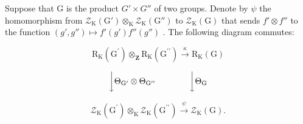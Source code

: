 Suppose that G is the product \(G' \times G''\) of two groups. Denote by \(\psi\) the homomorphism from \(\mathcal{Z}_{\mathrm{K}}(\mathrm{G}') \otimes_{\mathrm{K}} \mathcal{Z}_{\mathrm{K}}(\mathrm{G}'' )\) to \(\mathcal{Z}_{\mathrm{K}}(\mathrm{G})\) that sends \(f' \otimes f''\) to the function \((g', g'') \mapsto f'(g')f''(g'')\) . The following diagram commutes:

\[
\mathrm{R} _ {\mathrm{K}} (\mathrm{G} ^ {\prime}) \otimes_ {\mathbf {Z}} \mathrm{R} _ {\mathrm{K}} (\mathrm{G} ^ {\prime \prime}) \xrightarrow {\kappa} \mathrm{R} _ {\mathrm{K}} (\mathrm{G})
\]

\[
\bigg \downarrow \Theta_ {\mathrm{G} ^ {\prime}} \otimes \Theta_ {\mathrm{G} ^ {\prime \prime}} \qquad \qquad \bigg \downarrow \Theta_ {\mathrm{G}}
\]

\[
\mathcal {Z} _ {\mathrm{K}} (\mathrm{G} ^ {\prime}) \otimes_ {\mathrm{K}} \mathcal {Z} _ {\mathrm{K}} (\mathrm{G} ^ {\prime \prime}) \xrightarrow {\psi} \mathcal {Z} _ {\mathrm{K}} (\mathrm{G}).
\]

